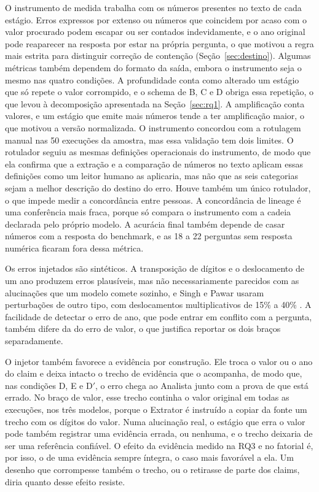 O instrumento de medida trabalha com os números presentes no texto de cada estágio.
Erros expressos por extenso ou números que coincidem por acaso com o valor procurado podem escapar ou ser contados indevidamente, e o ano original pode reaparecer na resposta por estar na própria pergunta, o que motivou a regra mais estrita para distinguir correção de contenção (Seção~\ref{sec:destino}).
Algumas métricas também dependem do formato da saída, embora o instrumento seja o mesmo nas quatro condições. A profundidade conta como alterado um estágio que só repete o valor corrompido, e o schema de B, C e D obriga essa repetição, o que levou à decomposição apresentada na Seção~\ref{sec:rq1}. A amplificação conta valores, e um estágio que emite mais números tende a ter amplificação maior, o que motivou a versão normalizada.
O instrumento concordou com a rotulagem manual nas 50 execuções da amostra, mas essa validação tem dois limites.
O rotulador seguiu as mesmas definições operacionais do instrumento, de modo que ela confirma que a extração e a comparação de números no texto aplicam essas definições como um leitor humano as aplicaria, mas não que as seis categorias sejam a melhor descrição do destino do erro.
Houve também um único rotulador, o que impede medir a concordância entre pessoas.
A concordância de lineage é uma conferência mais fraca, porque só compara o instrumento com a cadeia declarada pelo próprio modelo.
A acurácia final também depende de casar números com a resposta do benchmark, e as 18 a 22 perguntas sem resposta numérica ficaram fora dessa métrica.

Os erros injetados são sintéticos.
A transposição de dígitos e o deslocamento de um ano produzem erros plausíveis, mas não necessariamente parecidos com as alucinações que um modelo comete sozinho, e Singh e Pawar usaram perturbações de outro tipo, com deslocamentos multiplicativos de 15\% a 40\% \cite{singh2026snowball}.
A facilidade de detectar o erro de ano, que pode entrar em conflito com a pergunta, também difere da do erro de valor, o que justifica reportar os dois braços separadamente.

O injetor também favorece a evidência por construção.
Ele troca o valor ou o ano do claim e deixa intacto o trecho de evidência que o acompanha, de modo que, nas condições D, E e D$'$, o erro chega ao Analista junto com a prova de que está errado.
No braço de valor, esse trecho continha o valor original em todas as execuções, nos três modelos, porque o Extrator é instruído a copiar da fonte um trecho com os dígitos do valor.
Numa alucinação real, o estágio que erra o valor pode também registrar uma evidência errada, ou nenhuma, e o trecho deixaria de ser uma referência confiável.
O efeito da evidência medido na RQ3 e no fatorial é, por isso, o de uma evidência sempre íntegra, o caso mais favorável a ela. Um desenho que corrompesse também o trecho, ou o retirasse de parte dos claims, diria quanto desse efeito resiste.

